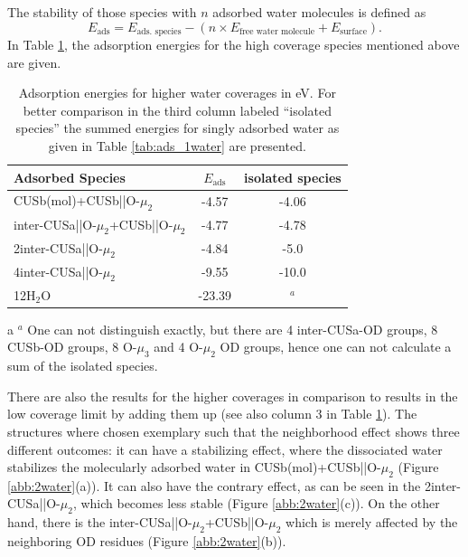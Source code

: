 \documentclass[11pt,DIV=13,BCOR=5mm,a4paper,headinclude]{scrbook}
\begin{document}
The stability of those species with $n$ adsorbed water molecules is defined as
\begin{equation}
 E_\textrm{ads}=E_\text{ads.
species}-(n\times E_\text{free water molecule}+E_\text{surface}).
\end{equation}
In Table \ref{tab:higher_water}, the adsorption energies for the high coverage species mentioned above are given.
\begin{table}[!ht]
  \centering
 \caption{Adsorption energies for higher water coverages in eV.
For better comparison in the third column labeled ``isolated species'' the summed energies for singly adsorbed water as given in Table \ref{tab:ads_1water} are presented.
\vspace*{.2cm} 
  }
  \begin{tabular}{lcc}
  \toprule
  Adsorbed Species  & $E_\text{ads}$ &isolated species \\\midrule
   CUSb(mol)+CUSb||O-$\mu_2$ & -4.57 & -4.06\\
   inter-CUSa||O-$\mu_2$+CUSb||O-$\mu_2$ & -4.77 & -4.78\\
   2inter-CUSa||O-$\mu_2$& -4.84 &-5.0 \\\hline
   4inter-CUSa||O-$\mu_2$ & -9.55 & -10.0\\\hline
   12H$_2$O & -23.39& $^a$\tnote{a} \\   \bottomrule
  \end{tabular}
  \label{tab:higher_water}
  \begin{tablenotes}\footnotesize 
    \item[a] $^a$ One can not distinguish exactly, but there are 4 inter-CUSa-OD groups, 8 CUSb-OD groups, 8 O-$\mu_3$ and 4 O-$\mu_2$ OD groups, hence one can not calculate a sum of the isolated species.
  \end{tablenotes}
\end{table}
There are also the results for the higher coverages in comparison to results in the low coverage limit by adding them up (see also column 3 in Table \ref{tab:higher_water}).
The structures where chosen exemplary such that the neighborhood effect shows three different outcomes: it can have a stabilizing effect, where the dissociated water stabilizes the molecularly adsorbed water in CUSb(mol)+CUSb||O-$\mu_2$ (Figure \ref{abb:2water}(a)).
It can also have the contrary effect, as can be seen in the  2inter-CUSa||O-$\mu_2$, which becomes less stable (Figure \ref{abb:2water}(c)).
On the other hand, there is the inter-CUSa||O-$\mu_2$+CUSb||O-$\mu_2$ which is merely affected by the neighboring OD residues (Figure \ref{abb:2water}(b)).
\end{document}
